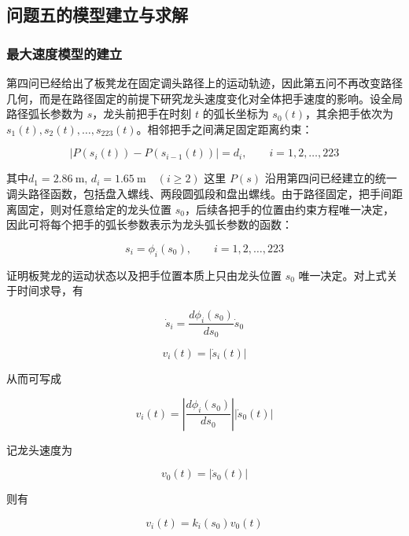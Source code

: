 \documentclass[UTF-8,a4paper,zihao=-4]{ctexart}
\begin{document}
\subsection{问题五的模型建立与求解}
\subsubsection{最大速度模型的建立}
第四问已经给出了板凳龙在固定调头路径上的运动轨迹，因此第五问不再改变路径几何，而是在路径固定的前提下研究龙头速度变化对全体把手速度的影响。设全局路径弧长参数为 $s$，龙头前把手在时刻 $t$ 的弧长坐标为 $s_0(t)$，其余把手依次为 $s_1(t),s_2(t),\dots,s_{223}(t)$。相邻把手之间满足固定距离约束：

\begin{equation}
|P(s_i(t))-P(s_{i-1}(t))|=d_i,\qquad i=1,2,\dots,223
\end{equation}

其中$d_1=2.86\ \mathrm{m}$, $d_i=1.65\ \mathrm{m}\quad (i\ge 2)$
这里 $P(s)$ 沿用第四问已经建立的统一调头路径函数，包括盘入螺线、两段圆弧段和盘出螺线。由于路径固定，把手间距离固定，则对任意给定的龙头位置 $s_0$，后续各把手的位置由约束方程唯一决定，因此可将每个把手的弧长参数表示为龙头弧长参数的函数：

\begin{equation}
s_i=\phi_i(s_0),\qquad i=1,2,\dots,223
\end{equation}

证明板凳龙的运动状态以及把手位置本质上只由龙头位置 $s_0$ 唯一决定。对上式关于时间求导，有

\begin{equation}
\dot{s}_i=\frac{d\phi_i(s_0)}{ds_0}\dot{s}_0
\end{equation}

\begin{equation}
v_i(t)=|\dot{s}_i(t)|
\end{equation}

从而可写成

\begin{equation}
v_i(t)=\left|\frac{d\phi_i(s_0)}{ds_0}\right||\dot{s}_0(t)|
\end{equation}

记龙头速度为

\begin{equation}
v_0(t)=|\dot{s}_0(t)|
\end{equation}

则有

\begin{equation}
v_i(t)=k_i(s_0)v_0(t)
\end{equation}
\end{document}
